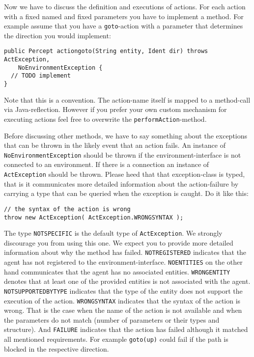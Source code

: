 \documentclass[a4]{article}
\begin{document}
Now we have to discuss the definition and executions of actions. 
For each action with a fixed named and fixed parameters you have to implement a method.
For example assume that you have a \texttt{goto}-action with a parameter that determines the
direction you would implement:
\begin{verbatim}
public Percept actiongoto(String entity, Ident dir) throws ActException, 
    NoEnvironmentException {
  // TODO implement
}
\end{verbatim}
Note that this is a convention. The action-name itself is mapped to a method-call via Java-reflection.
However if you prefer your own custom mechanism for executing actions feel free to overwrite the \texttt{performAction}-method. 

Before discussing other methods, we have to say something about the exceptions that can be thrown in the likely event
that an action fails. An instance of \texttt{NoEnvironmentException} should be thrown if the environment-interface is not
connected to an environment. If there is a connection an instance of \texttt{ActException} should be thrown. 
Please heed that that exception-class is typed, that is it communicates more detailed information about the 
action-failure by carrying a type that can be queried when the exception is caught. Do it like this:
\begin{verbatim}
// the syntax of the action is wrong
throw new ActException( ActException.WRONGSYNTAX );
\end{verbatim}
The type \texttt{NOTSPECIFIC} is the default type of \texttt{ActException}. We strongly discourage you from using this one.
We expect you to provide more detailed information about why the method has failed.
\texttt{NOTREGISTERED} indicates that the agent has not registered to the environment-interface.
\texttt{NOENTITIES} on the other hand communicates that the agent has no associated entities.
\texttt{WRONGENTITY} denotes that at least one of the provided entities is not associated with the agent.
\texttt{NOTSUPPORTEDBYTYPE} indicates that the type of the entity does not support the execution of the action.
\texttt{WRONGSYNTAX} indicates that the syntax of the action is wrong. 
That is the case when the name of the action is not available and when the parameters do not match (number of parameters or their types and structure).
And \texttt{FAILURE} indicates that the action has failed although it matched all mentioned requirements. 
For example \texttt{goto(up)} could fail if the path is blocked in the respective direction.
\end{document}
